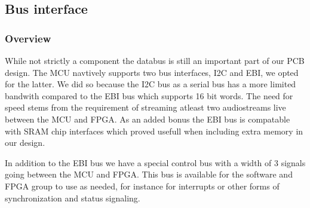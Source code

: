 \subsection{Bus interface}
\subsubsection{Overview}

While not strictly a component the databus is still an important part of
our PCB design. The MCU navtively supports two bus interfaces, I2C and EBI,
we opted for the latter. We did so because the I2C bus as a 
serial bus has a more limited bandwith compared to the EBI bus which 
supports 16 bit words. The need for speed stems from the requirement of
streaming atleast two audiostreams  live between the MCU and FPGA.
As an added bonus the EBI bus is compatable with SRAM chip interfaces 
which proved usefull when including extra memory in our design.


In addition to the EBI bus we have a special control bus with a width
of 3 signals going between the MCU and FPGA. This bus is available for the
software and FPGA group to use as needed, for instance for interrupts or
other forms of synchronization and status signaling.